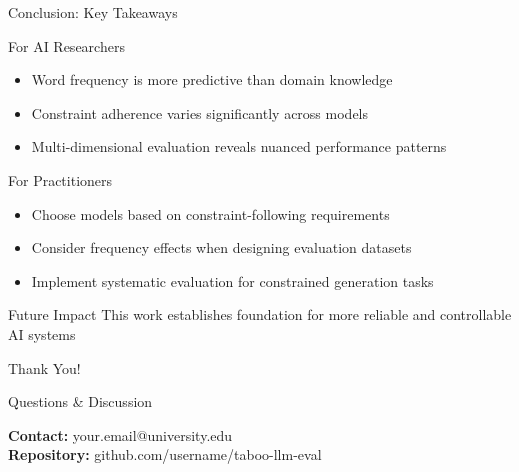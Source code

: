 \documentclass[aspectratio=169]{beamer}
\begin{document}
\begin{frame}{Conclusion: Key Takeaways}
\begin{alertblock}{For AI Researchers}
\begin{itemize}
    \item Word frequency is more predictive than domain knowledge
    \item Constraint adherence varies significantly across models
    \item Multi-dimensional evaluation reveals nuanced performance patterns
\end{itemize}
\end{alertblock}

\begin{alertblock}{For Practitioners}
\begin{itemize}
    \item Choose models based on constraint-following requirements
    \item Consider frequency effects when designing evaluation datasets
    \item Implement systematic evaluation for constrained generation tasks
\end{itemize}
\end{alertblock}

\begin{exampleblock}{Future Impact}
This work establishes foundation for more reliable and controllable AI systems
\end{exampleblock}
\end{frame}

\begin{frame}[plain]
\begin{center}
\huge Thank You!

\vspace{1cm}

\Large Questions \& Discussion

\vspace{1cm}

\normalsize
\textbf{Contact:} your.email@university.edu\\
\textbf{Repository:} github.com/username/taboo-llm-eval
\end{center}
\end{frame}
\end{document}
